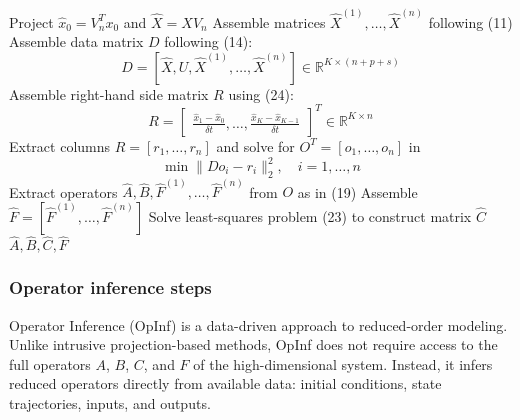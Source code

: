 \documentclass{article}
\begin{document}
\vspace{1cm}

\begin{algorithm}
\begin{algorithmic}[1]
    \State Project $\hat{x}_0 = V_n^T x_0$ and $\hat{X} = X V_n$
    \State Assemble matrices $\hat{X}^{(1)}, \dots, \hat{X}^{(n)}$ following (11)
    \State Assemble data matrix $D$ following (14): 
          \[
             D = [\hat{X}, U, \hat{X}^{(1)}, \dots, \hat{X}^{(n)}] \in \mathbb{R}^{K \times (n+p+s)}
          \]
    \State Assemble right-hand side matrix $R$ using (24): 
          \[
             R = 
             \begin{bmatrix}
                \frac{\hat{x}_1 - \hat{x}_0}{\delta t}, \dots, 
                \frac{\hat{x}_K - \hat{x}_{K-1}}{\delta t}
             \end{bmatrix}^T 
             \in \mathbb{R}^{K \times n}
          \]
    \State Extract columns $R = [r_1, \dots, r_n]$ and solve for $O^T = [o_1, \dots, o_n]$ in
          \[
             \min \|D o_i - r_i\|_2^2, \quad i = 1, \dots, n
          \]
    \State Extract operators $\hat{A}, \hat{B}, \hat{F}^{(1)}, \dots, \hat{F}^{(n)}$ from $O$ as in (19)
    \State Assemble $\hat{F} = [\hat{F}^{(1)}, \dots, \hat{F}^{(n)}]$
    \State Solve least-squares problem (23) to construct matrix $\hat{C}$
    \State \Return $\hat{A}, \hat{B}, \hat{C}, \hat{F}$
\EndProcedure
\end{algorithmic}
\end{algorithm}

\vspace{1cm}

\subsubsection*{Operator inference steps}

\vspace{1cm}

Operator Inference (OpInf) is a data-driven approach to reduced-order modeling.  
Unlike intrusive projection-based methods, OpInf does not require access to the 
full operators $A$, $B$, $C$, and $F$ of the high-dimensional system. 
Instead, it infers reduced operators directly from available data: 
initial conditions, state trajectories, inputs, and outputs.
\end{document}
